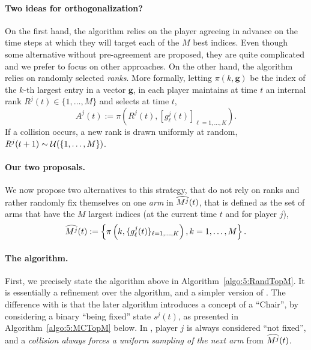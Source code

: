 \paragraph{Two ideas for orthogonalization?}
%
On the first hand, the \TDFS{} algorithm \citep{Zhao10} relies on the player agreeing in advance on the time steps at which they will target each of the $M$ best indices.
Even though some alternative without pre-agreement are proposed, they are quite complicated and we prefer to focus on other approaches.
%
On the other hand, the \rhoRand{} algorithm \citep{Anandkumar11} relies on randomly selected \emph{ranks}. %
%
More formally, letting $\pi(k,\mathbf{g})$ be the index of the $k$-th largest entry in a vector $\mathbf{g}$,
in \rhoRand{} each player maintains at time $t$ an internal rank $R^j(t)\in\{1,\dots,M\}$
and selects at time $t$,
\begin{equation}
  A^j(t) := \pi\left(R^j(t), [g^j_\ell(t)]_{\ell=1,\dots,K}\right).
\end{equation}
If a collision occurs, a new rank is drawn uniformly at random, $R^j(t+1) \sim \mathcal{U}(\{1,\dots,M\})$.


\paragraph{Our two proposals.}
We now propose two alternatives to this strategy, that do not rely on ranks and rather randomly fix themselves on one \emph{arm} in $\widehat{M^j}(t)$, that is defined as the set of arms that have the $M$ largest indices (at the current time $t$ and for player $j$),
\begin{equation}
  \widehat{M^j}(t) := \left\{ \pi\left(k, \{g^j_\ell(t)\}_{\ell=1,\dots,K}\right), k=1,\dots,M\right\}.
\end{equation}


\paragraph{The \RandTopM{} algorithm.}
%
First, we precisely state the \RandTopM{} algorithm above in Algorithm~\ref{algo:5:RandTopM}.
It is essentially a refinement over the \RhoRand{} algorithm, and a simpler version of \MCTopM.
The difference with \MCTopM{} is that the later algorithm introduces a concept of a ``Chair'', by considering a binary ``being fixed'' state $s^j(t)$, as presented in Algorithm~\ref{algo:5:MCTopM} below.
%
In \RandTopM{}, player $j$ is always considered ``not fixed'',
and a \emph{collision always forces a uniform sampling of the next arm} from $\widehat{M^j}(t)$.


